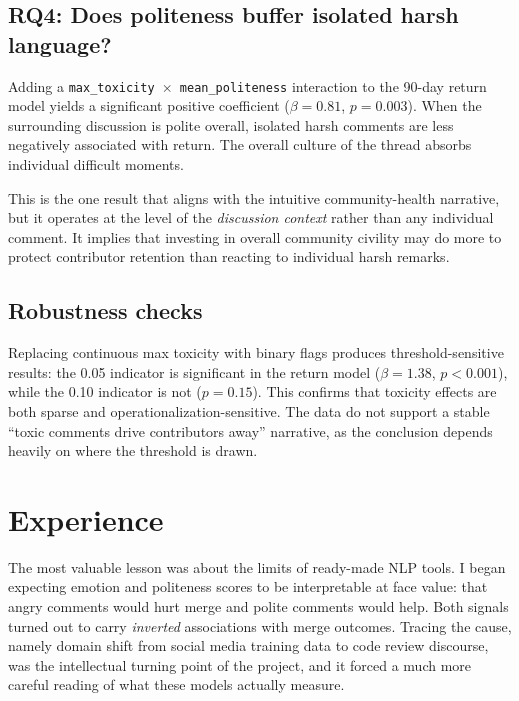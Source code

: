 \documentclass[12pt,a4paper]{article}
\begin{document}
\subsection{RQ4: Does politeness buffer isolated harsh language?}

Adding a \texttt{max\_toxicity $\times$ mean\_politeness} interaction to the 90-day return model yields a significant positive coefficient ($\beta = 0.81$, $p = 0.003$). When the surrounding discussion is polite overall, isolated harsh comments are less negatively associated with return. The overall culture of the thread absorbs individual difficult moments.

This is the one result that aligns with the intuitive community-health narrative, but it operates at the level of the \emph{discussion context} rather than any individual comment. It implies that investing in overall community civility may do more to protect contributor retention than reacting to individual harsh remarks.

\subsection{Robustness checks}

Replacing continuous max toxicity with binary flags produces threshold-sensitive results: the 0.05 indicator is significant in the return model ($\beta = 1.38$, $p < 0.001$), while the 0.10 indicator is not ($p = 0.15$). This confirms that toxicity effects are both sparse and operationalization-sensitive. The data do not support a stable ``toxic comments drive contributors away'' narrative, as the conclusion depends heavily on where the threshold is drawn.

\section{Experience}

The most valuable lesson was about the limits of ready-made NLP tools. I began expecting emotion and politeness scores to be interpretable at face value: that angry comments would hurt merge and polite comments would help. Both signals turned out to carry \emph{inverted} associations with merge outcomes. Tracing the cause, namely domain shift from social media training data to code review discourse, was the intellectual turning point of the project, and it forced a much more careful reading of what these models actually measure.
\end{document}
